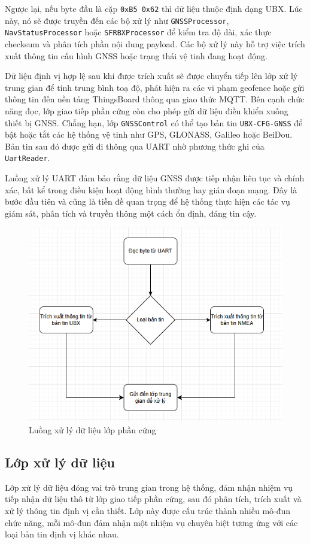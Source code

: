 \documentclass[../DoAn.tex]{subfiles}
\begin{document}
Ngược lại, nếu byte đầu là cặp \texttt{0xB5 0x62} thì dữ liệu thuộc định dạng UBX. Lúc này, nó sẽ được truyền đến các bộ xử lý như \texttt{GNSSProcessor}, \texttt{NavStatusProcessor} hoặc \texttt{SFRBXProcessor} để kiểm tra độ dài, xác thực checksum và phân tích phần nội dung payload. Các bộ xử lý này hỗ trợ việc trích xuất thông tin cấu hình GNSS hoặc trạng thái vệ tinh đang hoạt động.

Dữ liệu định vị hợp lệ sau khi được trích xuất sẽ được chuyển tiếp lên lớp xử lý trung gian để tính trung bình toạ độ, phát hiện ra các vi phạm geofence hoặc gửi thông tin đến nền tảng ThingsBoard thông qua giao thức MQTT. Bên cạnh chức năng đọc, lớp giao tiếp phần cứng còn cho phép gửi dữ liệu điều khiển xuống thiết bị GNSS. Chẳng hạn, lớp \texttt{GNSSControl} có thể tạo bản tin \texttt{UBX-CFG-GNSS} để bật hoặc tắt các hệ thống vệ tinh như GPS, GLONASS, Galileo hoặc BeiDou. Bản tin sau đó được gửi đi thông qua UART nhờ phương thức ghi của \texttt{UartReader}.

Luồng xử lý UART đảm bảo rằng dữ liệu GNSS được tiếp nhận liên tục và chính xác, bất kể trong điều kiện hoạt động bình thường hay gián đoạn mạng. Đây là bước đầu tiên và cũng là tiền đề quan trọng để hệ thống thực hiện các tác vụ giám sát, phân tích và truyền thông một cách ổn định, đáng tin cậy.
\begin{figure}[H]
    \includegraphics[width=\linewidth]{Hinhve/HardwareFlow.png}
    \caption{ Luồng xử lý dữ liệu lớp phần cứng}
    \label{fig:label}
\end{figure}
\subsection{Lớp xử lý dữ liệu}
\label{subsection:4.2.2}
Lớp xử lý dữ liệu đóng vai trò trung gian trong hệ thống, đảm nhận nhiệm vụ tiếp nhận dữ liệu thô từ lớp giao tiếp phần cứng, sau đó phân tích, trích xuất và xử lý thông tin định vị cần thiết. Lớp này được cấu trúc thành nhiều mô-đun chức năng, mỗi mô-đun đảm nhận một nhiệm vụ chuyên biệt tương ứng với các loại bản tin định vị khác nhau.
\end{document}
